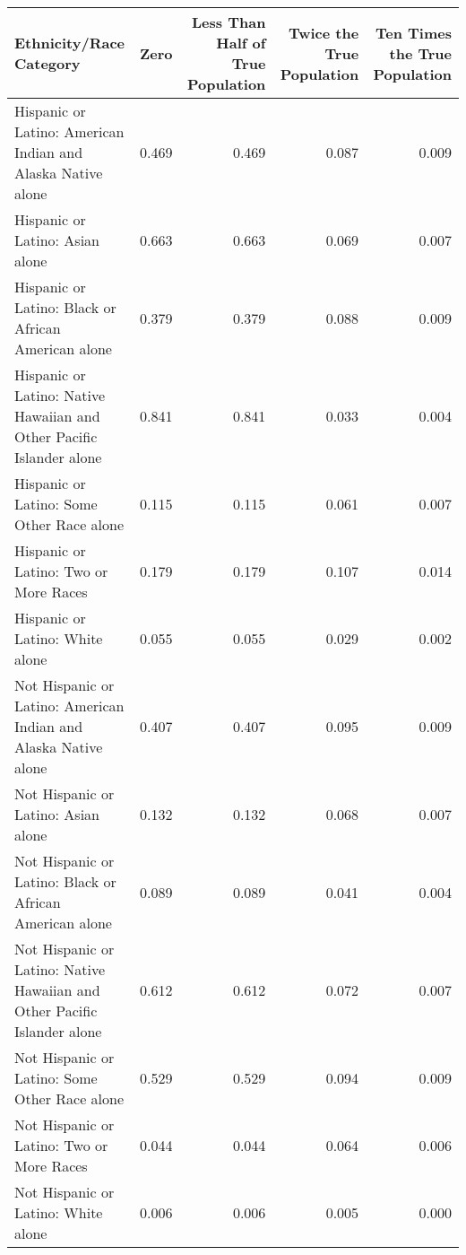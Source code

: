 \begin{table}[ht]
\centering
\begin{tabular}{lrrrr}
 Ethnicity/Race Category & Zero & Less Than Half of True Population & Twice the True Population & Ten Times the True Population \\ 
  \hline
Hispanic or Latino: American Indian and Alaska Native alone & 0.469 & 0.469 & 0.087 & 0.009 \\ 
   \hline
Hispanic or Latino: Asian alone & 0.663 & 0.663 & 0.069 & 0.007 \\ 
  Hispanic or Latino: Black or African American alone & 0.379 & 0.379 & 0.088 & 0.009 \\ 
  Hispanic or Latino: Native Hawaiian and Other Pacific Islander alone & 0.841 & 0.841 & 0.033 & 0.004 \\ 
  Hispanic or Latino: Some Other Race alone & 0.115 & 0.115 & 0.061 & 0.007 \\ 
  Hispanic or Latino: Two or More Races & 0.179 & 0.179 & 0.107 & 0.014 \\ 
  Hispanic or Latino: White alone & 0.055 & 0.055 & 0.029 & 0.002 \\ 
  Not Hispanic or Latino: American Indian and Alaska Native alone & 0.407 & 0.407 & 0.095 & 0.009 \\ 
  Not Hispanic or Latino: Asian alone & 0.132 & 0.132 & 0.068 & 0.007 \\ 
  Not Hispanic or Latino: Black or African American alone & 0.089 & 0.089 & 0.041 & 0.004 \\ 
  Not Hispanic or Latino: Native Hawaiian and Other Pacific Islander alone & 0.612 & 0.612 & 0.072 & 0.007 \\ 
  Not Hispanic or Latino: Some Other Race alone & 0.529 & 0.529 & 0.094 & 0.009 \\ 
  Not Hispanic or Latino: Two or More Races & 0.044 & 0.044 & 0.064 & 0.006 \\ 
  Not Hispanic or Latino: White alone & 0.006 & 0.006 & 0.005 & 0.000 \\ 
  \end{tabular}
\end{table}
